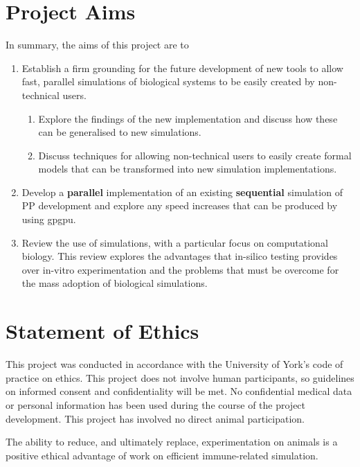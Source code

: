 \documentclass{UoYCSproject}
\begin{document}
\section{Project Aims}
In summary, the aims of this project are to
\begin{enumerate}
    \item Establish a firm grounding for the future development of new tools to allow fast, parallel simulations of biological systems to be easily created by non-technical users.
    \begin{enumerate}
        \item Explore the findings of the new implementation and discuss how these can be generalised to new simulations.
        \item Discuss techniques for allowing non-technical users to easily create formal models that can be transformed into new simulation implementations.
    \end{enumerate}
    \item Develop a \textbf{parallel} implementation of an existing \textbf{sequential} simulation of \gls{PP} development and explore any speed increases that can be produced by using \gls{gpgpu}.
    \item Review the use of simulations, with a particular focus on computational biology. This review explores the advantages that in-silico testing provides over \gls{in-vitro} experimentation and the problems that must be overcome for the mass adoption of biological simulations.
    
\end{enumerate}

\section{Statement of Ethics}
This project was conducted in accordance with the University of York's code of practice on ethics.
This project does not involve human participants, so guidelines on informed consent and confidentiality will be met. No confidential medical data or personal information has been used during the course of the project development. This project has involved no direct animal participation.

The ability to reduce, and ultimately replace, experimentation on animals is a positive ethical advantage of work on efficient immune-related simulation.
\end{document}
